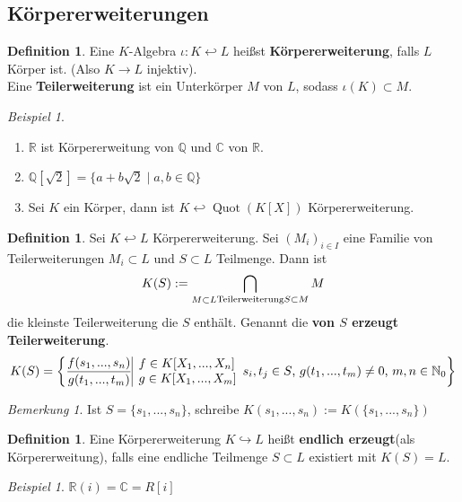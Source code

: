 \documentclass[10pt,a4paper]{article}
\newcommand{\N}{\ensuremath{\mathbb{N}}}
\newcommand{\Q}{\ensuremath{\mathbb{Q}}}
\newcommand{\R}{\ensuremath{\mathbb{R}}}
\newcommand{\C}{\ensuremath{\mathbb{C}}}
\newcommand{\Quot}{\operatorname{Quot}}
\newcounter{thm}[section]
\theoremstyle{definition}
\newtheorem{definition}[thm]{Definition}
\theoremstyle{plain}
\theoremstyle{remark}
\newtheorem*{bem*}{Bemerkung}
\newtheorem{exm}[thm]{Beispiel}
\begin{document}
\subsection{Körpererweiterungen}

\begin{definition}
	Eine $K$-Algebra $\iota:K\hookleftarrow L$ heißst \textbf{Körpererweiterung}, falls $L$ Körper ist. (Also $K\to L$ injektiv).\\
	Eine \textbf{Teilerweiterung} ist ein Unterkörper $M$ von $L$, sodass $\iota(K)\subset M$.
\end{definition}

\begin{exm}
	\begin{enumerate}
		\item $\R$ ist Körpererweitung von $\Q$ und $\C$ von $\R$.
		\item $\Q[\sqrt{2}]=\{a+b\sqrt{2}\mid a,b\in\Q\}$
		\item Sei $K$ ein Körper, dann ist $K\hookleftarrow \Quot(K[X])$ Körpererweiterung.
	\end{enumerate}
\end{exm}

\begin{definition}
	Sei $K\hookleftarrow L$ Körpererweiterung. Sei $(M_i)_{i\in I}$ eine Familie von Teilerweiterungen $M_i\subset L$ und $S\subset L$ Teilmenge. Dann ist 
	\[K(S):=\bigcap_{\substack{M\subset L}\\\text{Teilerweiterung}\\S\subset M}M\]
	die kleinste Teilerweiterung die $S$ enthält. Genannt die \textbf{von $S$ erzeugt Teilerweiterung}.
	\[K(S)=\left\{\frac{f(s_1,...,s_n)}{g(t_1,...,t_m)}\vline\begin{array}{l}
	f\in K[X_1,...,X_n]\\
	g\in K[X_1,...,X_m]
	\end{array}\text{$s_i,t_j\in S$, $g(t_1,...,t_m)\neq 0$, $m,n\in \N_0$}\right\}\]
\end{definition}
\begin{bem*}
	Ist $S=\{s_1,...,s_n\}$, schreibe $K(s_1,...,s_n):=K(\{s_1,...,s_n\})$
\end{bem*}
\begin{definition}
	Eine Körpererweiterung $K\hookrightarrow L$ heißt \textbf{endlich erzeugt}(als Körpererweitung), falls eine endliche Teilmenge $S\subset L$ existiert mit $K(S)=L$.
\end{definition}

\addtocounter{thm}{-1}
\begin{exm}
	$\R(i)=\C=R[i]$
\end{exm}
\end{document}
